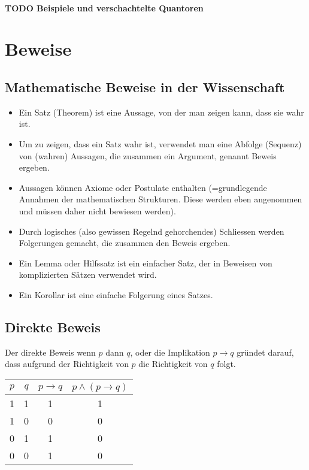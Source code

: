 \documentclass[12pt,a4paper]{article}
\begin{document}
\paragraph{TODO Beispiele und verschachtelte Quantoren}

\section{Beweise}
\subsection{Mathematische Beweise in der Wissenschaft}
\begin{itemize}[noitemsep,topsep=0pt,leftmargin=*]
    \item Ein Satz (Theorem) ist eine Aussage, von der man zeigen kann, dass sie wahr ist.
    \item Um zu zeigen, dass ein Satz wahr ist, verwendet man eine Abfolge (Sequenz) von (wahren) Aussagen, die zusammen ein Argument, genannt Beweis ergeben.
    \item Aussagen können Axiome oder Postulate enthalten (=grundlegende Annahmen der mathematischen Strukturen. Diese werden eben angenommen und müssen daher nicht bewiesen werden).
    \item Durch logisches (also gewissen Regelnd gehorchendes) Schliessen werden Folgerungen gemacht, die zusammen den Beweis ergeben.
    \item Ein Lemma oder Hilfssatz ist ein einfacher Satz, der in Beweisen von komplizierten Sätzen verwendet wird.
    \item Ein Korollar ist eine einfache Folgerung eines Satzes.
\end{itemize}

\subsection{Direkte Beweis}Der direkte Beweis wenn $p$ dann $q$, oder die Implikation $p \rightarrow q$ gründet darauf, dass aufgrund der Richtigkeit von $p$ die Richtigkeit von $q$ folgt.\\
\begin{tabular}{|c|c|c|c|}
    \hline
        $p$&$q$&$p \rightarrow q$&$p \wedge (p \rightarrow q)$\\
        \hline
        1&1&1&1\\
        1&0&0&0\\
        0&1&1&0\\
        0&0&1&0\\
    \hline
\end{tabular}
\end{document}
